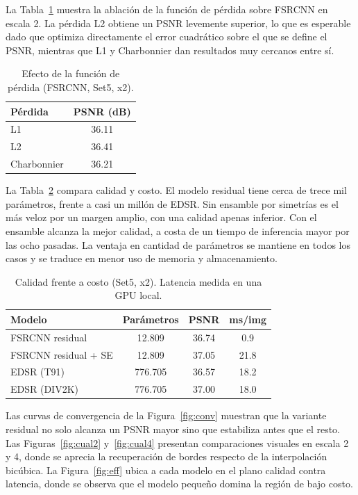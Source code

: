 \documentclass[conference]{IEEEtran}
\begin{document}
La Tabla~\ref{tab:loss} muestra la ablación de la función de pérdida sobre FSRCNN en escala 2. La
pérdida L2 obtiene un PSNR levemente superior, lo que es esperable dado que optimiza directamente
el error cuadrático sobre el que se define el PSNR, mientras que L1 y Charbonnier dan resultados
muy cercanos entre sí.

\begin{table}[!htb]
\caption{Efecto de la función de pérdida (FSRCNN, Set5, x2).}
\label{tab:loss}
\centering
\begin{tabular}{lc}
\toprule
Pérdida & PSNR (dB) \\
\midrule
L1 & 36.11 \\
L2 & 36.41 \\
Charbonnier & 36.21 \\
\bottomrule
\end{tabular}
\end{table}

La Tabla~\ref{tab:cost} compara calidad y costo. El modelo residual tiene cerca de trece mil
parámetros, frente a casi un millón de EDSR. Sin ensamble por simetrías es el más veloz por un
margen amplio, con una calidad apenas inferior. Con el ensamble alcanza la mejor calidad, a costa
de un tiempo de inferencia mayor por las ocho pasadas. La ventaja en cantidad de parámetros se
mantiene en todos los casos y se traduce en menor uso de memoria y almacenamiento.

\begin{table}[!htb]
\caption{Calidad frente a costo (Set5, x2). Latencia medida en una GPU local.}
\label{tab:cost}
\centering
\begin{tabular}{lccc}
\toprule
Modelo & Parámetros & PSNR & ms/img \\
\midrule
FSRCNN residual & 12.809 & 36.74 & 0.9 \\
FSRCNN residual + SE & 12.809 & 37.05 & 21.8 \\
EDSR (T91) & 776.705 & 36.57 & 18.2 \\
EDSR (DIV2K) & 776.705 & 37.00 & 18.0 \\
\bottomrule
\end{tabular}
\end{table}

Las curvas de convergencia de la Figura~\ref{fig:conv} muestran que la variante residual no solo
alcanza un PSNR mayor sino que estabiliza antes que el resto. Las Figuras~\ref{fig:cual2}
y~\ref{fig:cual4} presentan comparaciones visuales en escala 2 y 4, donde se aprecia la
recuperación de bordes respecto de la interpolación bicúbica. La Figura~\ref{fig:eff} ubica a cada
modelo en el plano calidad contra latencia, donde se observa que el modelo pequeño domina la región
de bajo costo.
\end{document}
